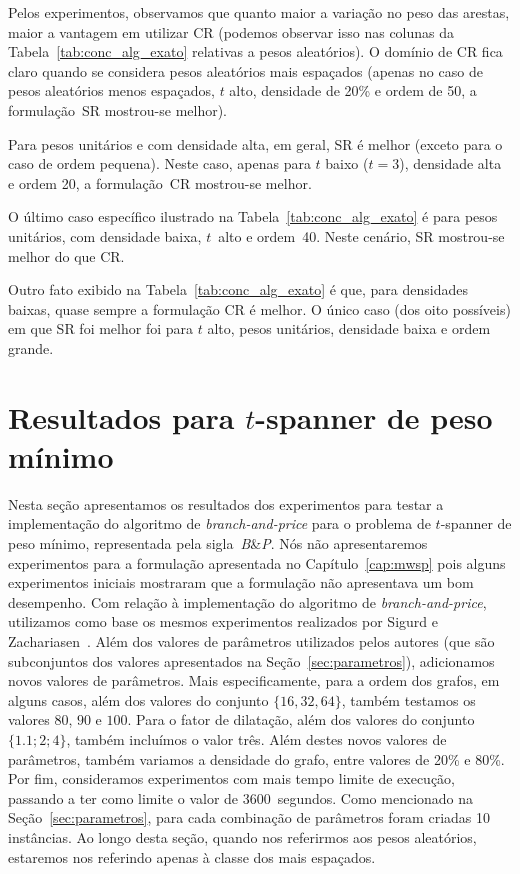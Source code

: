 Pelos experimentos, observamos que quanto maior a variação no peso das
arestas, maior a vantagem em utilizar CR (podemos observar isso nas
colunas da Tabela~\ref{tab:conc_alg_exato} relativas a pesos
aleatórios). O domínio de CR fica claro quando se considera pesos
aleatórios mais espaçados (apenas no caso de pesos aleatórios menos
espaçados, $t$ alto, densidade de 20\% e ordem de 50, a formulação~SR
mostrou-se melhor).

Para pesos unitários e com densidade alta, em geral, SR é melhor
(exceto para o caso de ordem pequena). Neste caso, apenas para $t$ baixo ($t = 3$),
densidade alta e ordem 20, a formulação~CR mostrou-se melhor.

O último caso específico ilustrado na Tabela~\ref{tab:conc_alg_exato}
é para pesos unitários, com densidade baixa, $t$~alto e
ordem~40. Neste cenário, SR mostrou-se melhor do que CR.

Outro fato exibido na Tabela~\ref{tab:conc_alg_exato} é que, para
densidades baixas, quase sempre a formulação CR é melhor. O único caso
(dos oito possíveis) em que SR foi melhor foi para $t$ alto, pesos
unitários, densidade baixa e ordem grande.


\section{Resultados para  $t$-spanner de peso mínimo}

Nesta seção apresentamos os resultados dos experimentos
para testar a implementação do algoritmo de \emph{branch-and-price}
para o problema de $t$-spanner de peso mínimo, representada pela
sigla~\emph{B}\&\emph{P}. Nós não apresentaremos experimentos para a
formulação apresentada no Capítulo~\ref{cap:mwsp} pois 
alguns experimentos iniciais mostraram que a
formulação não apresentava um bom desempenho.
Com relação à implementação do algoritmo de \emph{branch-and-price}, 
utilizamos como base os mesmos experimentos
realizados por Sigurd e Zachariasen~\cite{SigurdZ2004}. Além dos
valores de parâmetros utilizados pelos autores (que são subconjuntos
dos valores apresentados na Seção~\ref{sec:parametros}), adicionamos
novos valores de parâmetros. Mais especificamente, para a ordem dos
grafos, em alguns casos, além dos valores do conjunto
$\{16, 32, 64\}$, também testamos os valores $80$, $90$ e
$100$. Para o fator de dilatação, além dos valores do conjunto
$\{\num{1,1}; 2; 4\}$, também incluímos o valor três. Além destes novos
valores de parâmetros, também variamos a densidade do grafo, entre
valores de 20\% e 80\%.  Por fim, consideramos experimentos com mais
tempo limite de execução, passando a ter como limite o valor de
3600~segundos. Como mencionado na Seção~\ref{sec:parametros}, para cada
combinação de parâmetros foram criadas 10 instâncias.  Ao longo desta
seção, quando nos referirmos aos pesos aleatórios, estaremos nos
referindo apenas à classe dos mais espaçados.


